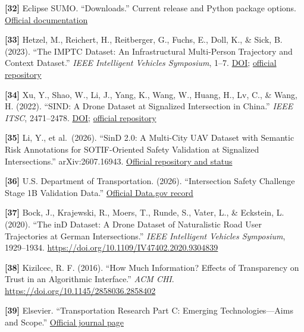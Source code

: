 \documentclass[
  english,
  11pt,
  a4paper,
]{article}
\begin{document}
\protect{}\label{source-32}{} \textbf{{[}32{]}} Eclipse
SUMO. ``Downloads.'' Current release and Python package options.
\href{https://sumo.dlr.de/docs/Downloads.php}{Official documentation}

\protect{}\label{source-33}{} \textbf{{[}33{]}} Hetzel, M.,
Reichert, H., Reitberger, G., Fuchs, E., Doll, K., \& Sick, B. (2023).
``The IMPTC Dataset: An Infrastructural Multi-Person Trajectory and
Context Dataset.'' \emph{IEEE Intelligent Vehicles Symposium}, 1--7.
\href{https://doi.org/10.1109/IV55152.2023.10186776}{DOI};
\href{https://github.com/kav-institute/imptc-dataset}{official
repository}

\protect{}\label{source-34}{} \textbf{{[}34{]}} Xu, Y.,
Shao, W., Li, J., Yang, K., Wang, W., Huang, H., Lv, C., \& Wang, H.
(2022). ``SIND: A Drone Dataset at Signalized Intersection in China.''
\emph{IEEE ITSC}, 2471--2478.
\href{https://doi.org/10.1109/ITSC55140.2022.9921959}{DOI};
\href{https://github.com/SOTIF-AVLab/SinD}{official repository}

\protect{}\label{source-35}{} \textbf{{[}35{]}} Li, Y., et
al.~(2026). ``SinD 2.0: A Multi-City UAV Dataset with Semantic Risk
Annotations for SOTIF-Oriented Safety Validation at Signalized
Intersections.'' arXiv:2607.16943.
\href{https://github.com/SOTIF-AVLab/SinD}{Official repository and
status}

\protect{}\label{source-36}{} \textbf{{[}36{]}} U.S.
Department of Transportation. (2026). ``Intersection Safety Challenge
Stage 1B Validation Data.''
\href{https://catalog.data.gov/dataset/intersection-safety-challenge-stage-1b-validation-data}{Official
Data.gov record}

\protect{}\label{source-37}{} \textbf{{[}37{]}} Bock, J.,
Krajewski, R., Moers, T., Runde, S., Vater, L., \& Eckstein, L. (2020).
``The inD Dataset: A Drone Dataset of Naturalistic Road User
Trajectories at German Intersections.'' \emph{IEEE Intelligent Vehicles
Symposium}, 1929--1934.
\url{https://doi.org/10.1109/IV47402.2020.9304839}

\protect{}\label{source-38}{} \textbf{{[}38{]}} Kizilcec,
R. F. (2016). ``How Much Information? Effects of Transparency on Trust
in an Algorithmic Interface.'' \emph{ACM CHI}.
\url{https://doi.org/10.1145/2858036.2858402}

\protect{}\label{source-39}{} \textbf{{[}39{]}} Elsevier.
``Transportation Research Part C: Emerging Technologies---Aims and
Scope.''
\href{https://shop.elsevier.com/journals/transportation-research-part-c-emerging-technologies/0968-090X}{Official
journal page}
\end{document}
